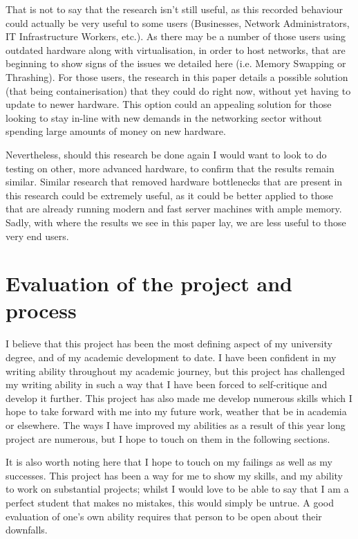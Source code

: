 That is not to say that the research isn't still useful, as this recorded behaviour could actually be very useful to some users (Businesses, Network Administrators, IT Infrastructure Workers, etc.). As there may be a number of those users using outdated hardware along with virtualisation, in order to host networks, that are beginning to show signs of the issues we detailed here (i.e. Memory Swapping or Thrashing). For those users, the research in this paper details a possible solution (that being containerisation) that they could do right now, without yet having to update to newer hardware. This option could an appealing solution for those looking to stay in-line with new demands in the networking sector without spending large amounts of money on new hardware.

Nevertheless, should this research be done again I would want to look to do testing on other, more advanced hardware, to confirm that the results remain similar. Similar research that removed hardware bottlenecks that are present in this research could be extremely useful, as it could be better applied to those that are already running modern and fast server machines with ample memory. Sadly, with where the results we see in this paper lay, we are less useful to those very end users.



\chapter{Evaluation of the project and process}%
I believe that this project has been the most defining aspect of my university degree, and of my academic development to date. I have been confident in my writing ability throughout my academic journey, but this project has challenged my writing ability in such a way that I have been forced to self-critique and develop it further. This project has also made me develop numerous skills which I hope to take forward with me into my future work, weather that be in academia or elsewhere. The ways I have improved my abilities as a result of this year long project are numerous, but I hope to touch on them in the following sections.

It is also worth noting here that I hope to touch on my failings as well as my successes. This project has been a way for me to show my skills, and my ability to work on substantial projects; whilst I would love to be able to say that I am a perfect student that makes no mistakes, this would simply be untrue. A good evaluation of one's own ability requires that person to be open about their downfalls.

